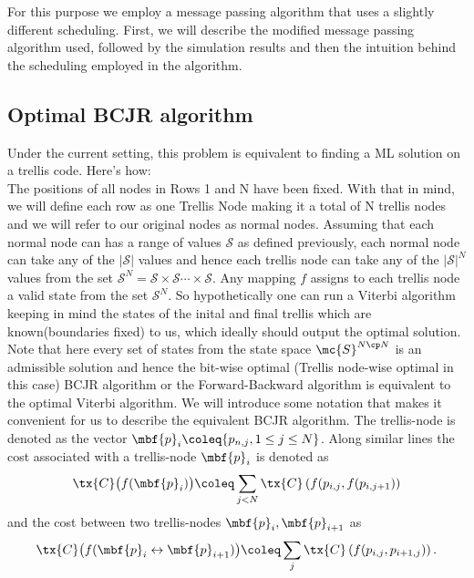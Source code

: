 \documentclass[journal, onecolumn]{IEEEtran}
\begin{document}
For this purpose we employ a message passing algorithm that uses a slightly different scheduling. First, we will describe the modified message passing algorithm used, followed by the simulation results and then the intuition behind the scheduling employed in the algorithm.

\subsection{Optimal BCJR algorithm}
Under the current setting, this problem is equivalent to finding a ML solution on a trellis code. Here's how:\\

The positions of all nodes in Rows 1 and N have been fixed. With that in mind, we will define each row as one Trellis Node making it a total of N trellis nodes and we will refer to our original nodes as normal nodes. Assuming that each normal node can has a range of values $\mathcal{S}$ as defined previously, each normal node can take any of the $|\mathcal{S}|$ values and hence each trellis node can take any of the $|\mathcal{S}|^{N}$ values from the set $\mathcal{S}^{N}=\mathcal{S} \times \mathcal{S} \cdots \times \mathcal{S}$. Any mapping $f$ assigns to each trellis node a valid state from the set $\mathcal{S}^{N}$. So hypothetically one can run a Viterbi algorithm keeping in mind the states of the inital and final trellis which are known(boundaries fixed) to us, which ideally should output the optimal solution. Note that here every set of states from the state space $\mc{S}^{N\cp N}$ is an admissible solution and hence the bit-wise optimal (Trellis node-wise optimal in this case) BCJR algorithm or the Forward-Backward algorithm is equivalent to the optimal Viterbi algorithm.
We will introduce some notation that makes it convenient for us to describe the equivalent BCJR algorithm. The trellis-node is denoted as the vector $\mbf{p}_{i}\coleq\{p_{n,j},1\leq j \leq N\}$. Along similar lines the cost associated with a trellis-node $\mbf{p}_{i}$ is denoted as
\begin{align*}
\tx{C}\big(f(\mbf{p}_{i})\big)\coleq\sum_{j<N}\tx{C}\left(f(p_{i,j},f(p_{i,j+1})\right)
\end{align*}
 and the cost between two trellis-nodes $\mbf{p}_{i},\mbf{p}_{i+1}$ as 
 \begin{align*}
\tx{C}\big(f(\mbf{p}_{i}\leftrightarrow\mbf{p}_{i+1})\big)\coleq \sum_{j}\tx{C}\left(f(p_{i,j},p_{i+1,j})\right).
\end{align*}
\end{document}
